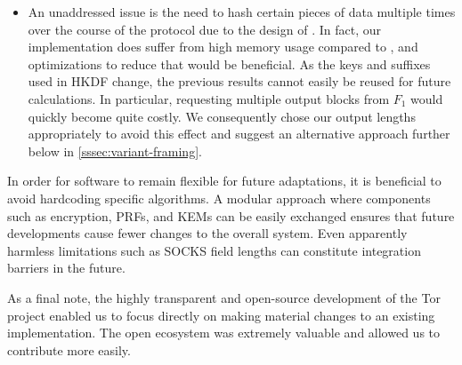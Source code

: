 \begin{itemize}
    \item An unaddressed issue is the need to hash certain pieces of data multiple times over the course of the protocol due to the design of \drivel{}. In fact, our implementation does suffer from high memory usage compared to \obfsfour{}, and optimizations to reduce that would be beneficial. As the keys and suffixes used in HKDF change, the previous results cannot easily be reused for future calculations. In particular, requesting multiple output blocks from $F_1$ would quickly become quite costly. We consequently chose our output lengths appropriately to avoid this effect and suggest an alternative approach further below in \cref{sssec:variant-framing}.
\end{itemize}

In order for software to remain flexible for future adaptations, it is beneficial to avoid hardcoding specific algorithms. A modular approach where components such as encryption, PRFs, and KEMs can be easily exchanged ensures that future developments cause fewer changes to the overall system. Even apparently harmless limitations such as SOCKS field lengths can constitute integration barriers in the future.

As a final note, the highly transparent and open-source development of the Tor project enabled us to focus directly on making material changes to an existing implementation. The open ecosystem was extremely valuable and allowed us to contribute more easily.

